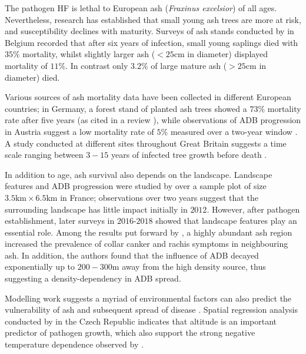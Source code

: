 The pathogen HF is lethal to European ash (\textit{Fraxinus excelsior}) of all ages. 
Nevertheless, research has established that small young ash trees are more at risk,
and susceptibility declines with maturity. Surveys of ash stands conducted by \cite{marccais2017estimation} 
in Belgium recorded that after six years of infection, small young saplings died with $35\%$ mortality, 
whilst slightly larger ash ($<25 \mathrm{cm}$ in diameter) displayed mortality of $11\%$. 
In contrast only $3.2\%$ of large mature ash ($>25\mathrm{cm}$ in diameter) died.

Various sources of ash mortality data have been collected in different European countries;
in Germany, a forest stand of planted ash trees showed a $73\%$
mortality rate after five years \cite{langer2015ash} (as cited in a review
\cite{enderle2017ash}), while observations of ADB progression in Austria
suggest a low mortality rate of $5\%$ measured over a two-year window \cite{kessler2012dieback}. 
A study conducted at different sites throughout Great Britain suggests a time scale ranging between 
$3-15$ years of infected tree growth before death \cite{wylder2018evidence}.

In addition to age, ash survival also depends on the landscape. 
Landscape features and ADB progression were studied by \cite{https://doi.org/10.1111/1365-2745.13383} 
over a sample plot of size  $\mathrm{3.5km \times 6.5 km}$ in France; observations over two years
suggest that the surrounding landscape has little impact initially in $2012$. However, after pathogen establishment, 
later surveys in $2016$-$2018$ showed that landscape features play an essential role.
Among the results put forward by \cite{https://doi.org/10.1111/1365-2745.13383}, 
a highly abundant ash region increased the prevalence of collar canker and rachis symptoms in neighbouring ash.
In addition, the authors found that the influence of ADB decayed exponentially up to $200-300\mathrm{m}$ away from the high density source,
thus suggesting a density-dependency in ADB spread.

Modelling work suggests a myriad of environmental factors can also predict the
vulnerability of ash and subsequent spread of disease \cite{dal2014risk}.
Spatial regression analysis conducted by \cite{chumanova2019predicting} in the Czech Republic indicates that altitude 
is an important predictor of pathogen growth, which also support the strong negative temperature dependence observed by \cite{hauptman2013temperature}.

\newpage

